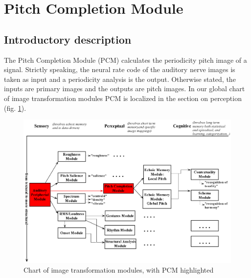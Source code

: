 \newpage
\section{Pitch Completion Module}

\hypertarget{Concepts:PitchCompletionModule}{}

\hypertarget{Concepts:IPEMPeriodicityPitch}{}

\subsection{Introductory description}

The Pitch Completion Module (PCM) calculates the periodicity pitch
image of a signal. Strictly speaking, the neural rate code of the
auditory nerve images is taken as input and a periodicity analysis
is the output. Otherwise stated, the inputs are primary images and
the outputs are pitch images. In our global chart of image
transformation modules PCM is localized in the section on
perception (fig. \ref{Fig:ModulesPCM}).
\begin{figure}[h]
    \centering
    \includegraphics[width=\textwidth]{Graphics/ModulesPCM}
    \caption{Chart of image transformation modules, with PCM highlighted}
    \label{Fig:ModulesPCM}
\end{figure}

